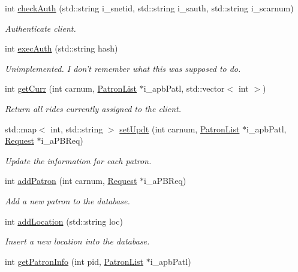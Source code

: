 \begin{DoxyCompactItemize}
int \hyperlink{classMySQLConn_ae96f09e4aa859a5294c90ec498c38928}{check\-Auth} (std\-::string i\-\_\-snetid, std\-::string i\-\_\-sauth, std\-::string i\-\_\-scarnum)
\begin{DoxyCompactList}\small\item\em Authenticate client. \end{DoxyCompactList}\item 
int \hyperlink{classMySQLConn_ab0a639e5ebb4220e82f4e4f994059774}{exec\-Auth} (std\-::string hash)
\begin{DoxyCompactList}\small\item\em Unimplemented. I don't remember what this was supposed to do. \end{DoxyCompactList}\item 
int \hyperlink{classMySQLConn_a259785bc51cae6d0c6c950f6bdf6f475}{get\-Curr} (int carnum, \hyperlink{classPatronList}{Patron\-List} $\ast$i\-\_\-apb\-Patl, std\-::vector$<$ int $>$)
\begin{DoxyCompactList}\small\item\em Return all rides currently assigned to the client. \end{DoxyCompactList}\item 
std\-::map$<$ int, std\-::string $>$ \hyperlink{classMySQLConn_a1653065e63d0dc420392b5694e688237}{set\-Updt} (int carnum, \hyperlink{classPatronList}{Patron\-List} $\ast$i\-\_\-apb\-Patl, \hyperlink{classRequest}{Request} $\ast$i\-\_\-a\-P\-B\-Req)
\begin{DoxyCompactList}\small\item\em Update the information for each patron. \end{DoxyCompactList}\item 
int \hyperlink{classMySQLConn_a017c08a9bfdf5c20509f754af7c8c7f7}{add\-Patron} (int carnum, \hyperlink{classRequest}{Request} $\ast$i\-\_\-a\-P\-B\-Req)
\begin{DoxyCompactList}\small\item\em Add a new patron to the database. \end{DoxyCompactList}\item 
int \hyperlink{classMySQLConn_a045c9cb16434df8c1e50dd7ef6766c5f}{add\-Location} (std\-::string loc)
\begin{DoxyCompactList}\small\item\em Insert a new location into the database. \end{DoxyCompactList}\item 
int \hyperlink{classMySQLConn_ae26fdad9114c884ff5b8bfefebee4254}{get\-Patron\-Info} (int pid, \hyperlink{classPatronList}{Patron\-List} $\ast$i\-\_\-apb\-Patl)

\end{DoxyCompactItemize}
